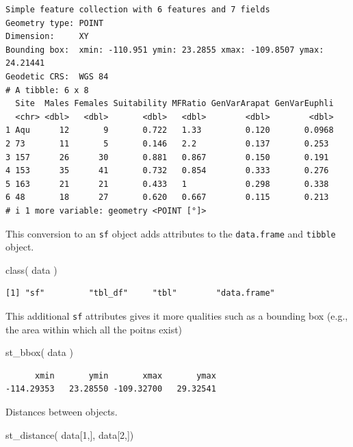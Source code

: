 \documentclass[
  letterpaper,
]{book}
\newenvironment{Shaded}{\begin{snugshade}}{\end{snugshade}}
\newcommand{\DecValTok}[1]{\textcolor[rgb]{0.68,0.00,0.00}{#1}}
\newcommand{\FunctionTok}[1]{\textcolor[rgb]{0.28,0.35,0.67}{#1}}
\newcommand{\NormalTok}[1]{\textcolor[rgb]{0.00,0.23,0.31}{#1}}
\begin{document}
\begin{verbatim}
Simple feature collection with 6 features and 7 fields
Geometry type: POINT
Dimension:     XY
Bounding box:  xmin: -110.951 ymin: 23.2855 xmax: -109.8507 ymax: 24.21441
Geodetic CRS:  WGS 84
# A tibble: 6 x 8
  Site  Males Females Suitability MFRatio GenVarArapat GenVarEuphli
  <chr> <dbl>   <dbl>       <dbl>   <dbl>        <dbl>        <dbl>
1 Aqu      12       9       0.722   1.33         0.120       0.0968
2 73       11       5       0.146   2.2          0.137       0.253 
3 157      26      30       0.881   0.867        0.150       0.191 
4 153      35      41       0.732   0.854        0.333       0.276 
5 163      21      21       0.433   1            0.298       0.338 
6 48       18      27       0.620   0.667        0.115       0.213 
# i 1 more variable: geometry <POINT [°]>
\end{verbatim}

This conversion to an \texttt{sf} object adds attributes to the
\texttt{data.frame} and \texttt{tibble} object.

\begin{Shaded}
\begin{Highlighting}[]
\FunctionTok{class}\NormalTok{( data )}
\end{Highlighting}
\end{Shaded}

\begin{verbatim}
[1] "sf"         "tbl_df"     "tbl"        "data.frame"
\end{verbatim}

This additional \texttt{sf} attributes gives it more qualities such as a
bounding box (e.g., the area within which all the poitns exist)

\begin{Shaded}
\begin{Highlighting}[]
\FunctionTok{st\_bbox}\NormalTok{( data )}
\end{Highlighting}
\end{Shaded}

\begin{verbatim}
      xmin       ymin       xmax       ymax 
-114.29353   23.28550 -109.32700   29.32541 
\end{verbatim}

Distances between objects.

\begin{Shaded}
\begin{Highlighting}[]
\FunctionTok{st\_distance}\NormalTok{( data[}\DecValTok{1}\NormalTok{,], data[}\DecValTok{2}\NormalTok{,])}
\end{Highlighting}
\end{Shaded}
\end{document}
